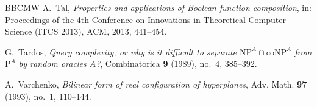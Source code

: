 \documentclass[11pt,reqno]{amsart}
\theoremstyle{definition}
\theoremstyle{remark}
\numberwithin{equation}{section}
\theoremstyle{named}
\theoremstyle{plain}
\begin{document}
\begin{thebibliography}{BBCMW}
 A.~Tal, \emph{Properties and applications of Boolean function composition}, in:
Proceedings of the 4th Conference on Innovations in Theoretical Computer Science (ITCS 2013), ACM,
2013, 441--454.

 G.~Tardos, \emph{Query complexity, or why is it difficult to separate
$\mathrm{NP}^{A}\cap\mathrm{coNP}^{A}$ from $\mathrm{P}^{A}$ by random oracles $A$?}, Combinatorica
\textbf{9} (1989), no.~4, 385--392.

 A.~Varchenko, \emph{Bilinear form of real configuration of hyperplanes}, Adv.
Math. \textbf{97} (1993), no.~1, 110--144.

\end{thebibliography}
\end{document}
